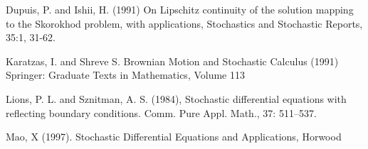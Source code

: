 \documentclass[]{article}
\theoremstyle{definition}
\theoremstyle{assumption}
\theoremstyle{remark}
\begin{document}
\begin{thebibliography}{9}

Dupuis, P. and Ishii, H. (1991) On Lipschitz continuity of the solution
mapping to the Skorokhod problem, with applications, Stochastics and Stochastic Reports,
35:1, 31-62.

Karatzas, I. and Shreve S. Brownian Motion and Stochastic Calculus (1991) Springer: Graduate Texts in Mathematics, Volume 113

 Lions, P. L. and Sznitman, A. S. (1984), Stochastic differential equations with reflecting boundary conditions. Comm. Pure Appl. Math., 37: 511–537.

Mao, X (1997). Stochastic Differential Equations and Applications, Horwood

\end{thebibliography}
\end{document}
